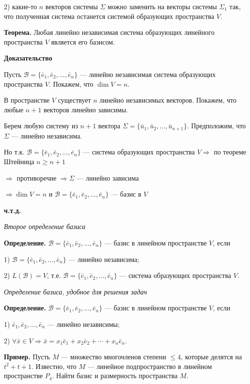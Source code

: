 \documentclass[12pt,a4paper]{article}
\newcommand{\vu}{\bar u}
\newcommand{\vx}{\bar x}
\newcommand{\ve}{\bar e}
\begin{document}
2) какие-то $n$ векторов системы $\Sigma$ можно заменить на векторы
системы $\Sigma_1$ так, что полученная система останется системой
образующих пространства $V$.

\textbf{Теорема.} Любая линейно независимая система образующих
линейного пространства $V$ является его базисом.

\textbf{Доказательство}

Пусть $\mathcal{B} = \{\ve_1, \ve_2, \ldots, \ve_n\}$ --- линейно
независимая система образующих пространства $V$. Покажем, что $\dim V = n$.

В пространстве $V$ существует $n$ линейно независимых векторов.
Покажем, что любые $n+1$ векторов линейно зависимы.

Берем любую систему из $n+1$ вектора $\Sigma = \{\vu_1, \vu_2,
\ldots, \vu_{n+1}\}$. Предположим, что $\Sigma$ --- линейно независима.

Но т.к. $\mathcal{B} = \{\ve_1, \ve_2, \ldots, \ve_n\}$ --- система
образующих пространства $V \Rightarrow$ по теореме Штейница $n \ge n + 1$

$\Rightarrow$ противоречие $\Rightarrow \Sigma$ --- линейно зависима

$\Rightarrow \dim V = n$ и $\mathcal{B} = \{\ve_1, \ve_2, \ldots,
\ve_n\}$ --- базис в $V$

\textbf{ч.т.д.}

\textit{Второе определение базиса}

\textbf{Определение.} $\mathcal{B} = \{\ve_1, \ve_2, \ldots, \ve_n\}$
--- базис в линейном пространстве $V$, если

1) $\mathcal{B} = \{\ve_1, \ve_2, \ldots, \ve_n\}$ --- линейно независима;

2) $L(\mathcal{B}) = V$, т.е. $\mathcal{B} = \{\ve_1, \ve_2, \ldots,
\ve_n\}$ --- система образующих пространства $V$.

\textit{Определение базиса, удобное для решения задач}

\textbf{Определение.} $\mathcal{B} = \{\ve_1, \ve_2, \ldots, \ve_n\}$
--- базис в линейном пространстве $V$, если

1) $\ve_1, \ve_2, \ldots, \ve_n$ --- линейно независимы;

2) $\forall \vx \in V \Rightarrow \vx = x_1 \ve_1 + x_2 \ve_2 +
\cdots + x_n \ve_n$.

\textbf{Пример.} Пусть $M$ --- множество многочленов степени $\le 4$,
которые делятся на $t^2 + t + 1$. Известно, что $M$ --- линейное
подпространство в линейном пространстве $P_4$. Найти базис и
размерность пространства $M$.
\end{document}
